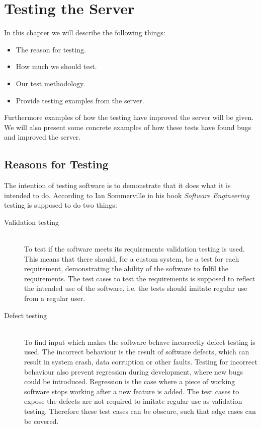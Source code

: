 \chapter{Testing the Server}\label{cha:testing}
In this chapter we will describe the following things:
\begin{itemize}
    \item The reason for testing.
    \item How much we should test.
    \item Our test methodology.
    \item Provide testing examples from the server.
\end{itemize}

Furthermore examples of how the testing have improved the server will be given.
We will also present some concrete examples of how these tests have found bugs and improved the server.

\section{Reasons for Testing}
The intention of testing software is to demonstrate that it does what it is intended to do.
According to Ian Sommerville in his book \textit{Software Engineering}\cite[p.~227]{software_engineering} testing is supposed to do two things:

\begin{description}
    \item[Validation testing]\cite[p.~227]{software_engineering} \hfill\\
    To test if the software meets its requirements validation testing is used.
    This means that there should, for a custom system, be a test for each requirement,
    demonstrating the ability of the software to fulfil the requirements.
    The test cases to test the requirements is supposed to reflect the intended use of the software,
    i.e. the tests should imitate regular use from a regular user.

    \item[Defect testing]\cite[p.~227]{software_engineering} \hfill\\
    To find input which makes the software behave incorrectly defect testing is used.
    The incorrect behaviour is the result of software defects,
    which can result in system crash, data corruption or other faults.
    Testing for incorrect behaviour also prevent regression during development,
    where new bugs could be introduced.
    Regression is the case where a piece of working software stops working after a new feature is added\cite{regression}.
    The test cases to expose the defects are not required to imitate regular use as validation testing.
    Therefore these test cases can be obscure, such that edge cases can be covered.
\end{description}

